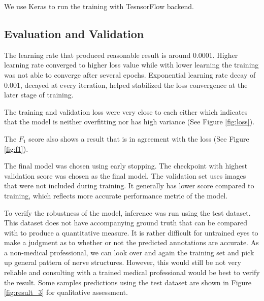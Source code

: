 We use Keras \cite{chollet2015keras} to run the training with TesnsorFlow \cite{tensorflow2015-whitepaper} backend.


\subsection{Evaluation and Validation}
The learning rate that produced reasonable result is around 0.0001. Higher learning rate converged to higher loss value while with lower learning the training was not able to converge after several epochs. Exponential learning rate decay of 0.001, decayed at every iteration, helped stabilized the loss convergence at the later stage of training.

The training and validation loss were very close to each either which indicates that the model is neither overfitting nor has high variance (See Figure \ref{fig:loss}).

The $F_1$ score also shows a result that is in agreement with the loss (See Figure \ref{fig:f1}).

The final model was chosen using early stopping. The checkpoint with highest validation score was chosen as the final model. The validation set uses images that were not included during training. It generally has lower score compared to training, which reflects more accurate performance metric of the model.


To verify the robustness of the model, inference was run using the test dataset. This dataset does not have accompanying ground truth that can be compared with to produce a quantitative measure. It is rather difficult for untrained eyes to make a judgment as to whether or not the predicted annotations are accurate. As a non-medical professional, we can look over and again the training set and pick up general pattern of nerve structures. However, this would still be not very reliable and consulting with a trained medical professional would be best to verify the result. Some samples predictions using the test dataset are shown in Figure \ref{fig:result_3} for qualitative assessment.